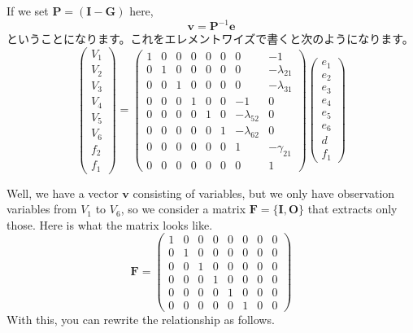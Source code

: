 \documentclass{ltjsbook}
\begin{document}

If we set $\bm{P} = (\bm{I}-\bm{G})$ here,
\[ \bm{v} = \bm{P}^{-1}\bm{e} \]
ということになります。これをエレメントワイズで書くと次のようになります。
\[
	\begin{pmatrix} V_1 \\ V_2 \\ V_3 \\ V_4 \\ V_5 \\ V_6 \\ f_2 \\f_1 \end{pmatrix} =
	\begin{pmatrix} 1 & 0 & 0 & 0 & 0 & 0 & 0             & -1            \\
                0 & 1 & 0 & 0 & 0 & 0 & 0             & -\lambda_{21} \\
                0 & 0 & 1 & 0 & 0 & 0 & 0             & -\lambda_{31} \\
                0 & 0 & 0 & 1 & 0 & 0 & -1            & 0             \\
                0 & 0 & 0 & 0 & 1 & 0 & -\lambda_{52} & 0             \\
                0 & 0 & 0 & 0 & 0 & 1 & -\lambda_{62} & 0             \\
                0 & 0 & 0 & 0 & 0 & 0 & 1             & -\gamma_{21}  \\
                0 & 0 & 0 & 0 & 0 & 0 & 0             & 1\end{pmatrix}
	\begin{pmatrix} e_1 \\ e_2 \\ e_3 \\ e_4 \\ e_5 \\ e_6 \\ d \\f_1 \end{pmatrix}
\]

Well, we have a vector $\bm{v}$ consisting of variables, but we only have observation variables from $V_1$ to $V_6$, so we consider a matrix $\bm{F}=\{ \bm{I},\bm{O} \}$ that extracts only those. Here is what the matrix looks like.
\[
	\bm{F} =
	\begin{pmatrix} 1 & 0 & 0 & 0 & 0 & 0 & 0 & 0 \\
                0 & 1 & 0 & 0 & 0 & 0 & 0 & 0 \\
                0 & 0 & 1 & 0 & 0 & 0 & 0 & 0 \\
                0 & 0 & 0 & 1 & 0 & 0 & 0 & 0 \\
                0 & 0 & 0 & 0 & 1 & 0 & 0 & 0 \\
                0 & 0 & 0 & 0 & 0 & 1 & 0 & 0\end{pmatrix}
\]
With this, you can rewrite the relationship as follows.
\end{document}
